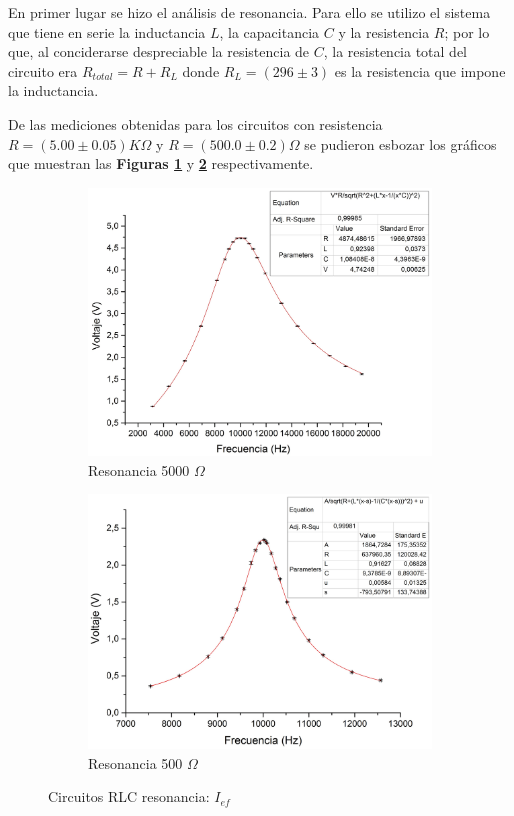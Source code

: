 \documentclass[11pt,a4paper]{article}
\begin{document}
En primer lugar se hizo el análisis de resonancia. Para ello se utilizo el sistema que tiene en serie la inductancia $L$, la capacitancia $C$ y la resistencia $R$; por lo que, al conciderarse despreciable la resistencia de $C$, la resistencia total del circuito era $R_{total} = R+R_{L}$ donde $R_{L} = (296 \pm 3)$ es la resistencia que impone la inductancia.

De las mediciones obtenidas para los circuitos con resistencia $R=(5.00 \pm 0.05)K\Omega$ y $R=(500.0 \pm 0.2)\Omega$ se pudieron esbozar los gráficos que muestran las \textbf{Figuras \ref{subfig:RES_I.a}} y \textbf{\ref{subfig:RES_I.b}} respectivamente.

\begin{figure}[h!]

\begin{subfigure}{0.5\textwidth}
\includegraphics[scale=0.3]{RLC_RES_5000_VvsF}
  \caption{Resonancia 5000 $\Omega$}
  \label{subfig:RES_I.a}
\end{subfigure}
\begin{subfigure}{0.5\textwidth}
\includegraphics[scale=0.32]{RLC_RES_500_VvsF}
  \caption{Resonancia 500 $\Omega$}
  \label{subfig:RES_I.b}
\end{subfigure}
  \caption{Circuitos RLC resonancia: $I_{ef}$}
  \label{fig:RES_I}
\end{figure}
\end{document}
